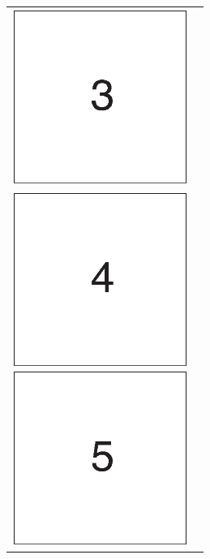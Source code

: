 \documentclass[11pt, oneside]{article}
\begin{document}
\begin{figure}[htbp]
\begin{tabular}{cc}
\begin{minipage}{0.333\hsize}
\begin{center}
\includegraphics[width=57mm]{../data/fig3.eps}
\end{center}
\end{minipage}
\\\vspace{\vmargin}
\begin{minipage}{0.333\hsize}
\begin{center}
\includegraphics[width=57mm]{../data/fig4.eps}
\end{center}
\end{minipage}

\begin{minipage}{0.333\hsize}
\begin{center}
\includegraphics[width=57mm]{../data/fig5.eps}
\end{center}
\end{minipage}


\end{tabular}
\end{figure}
\end{document}
